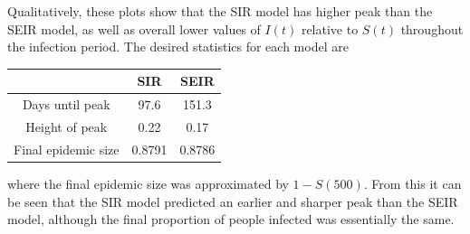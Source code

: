 \documentclass{article}
\begin{document}
\begin{figure}[H]
        \centering
\end{figure}
Qualitatively, these plots show that the SIR model has higher peak than the SEIR model, as well as overall lower values of $I(t)$ relative to $S(t)$ throughout the infection period. The desired statistics for each model are
\begin{center}
	\begin{tabular}{|c|c|c|}
		\hline
		& SIR & SEIR \\
		\hline
		Days until peak & 97.6 & 151.3 \\
		Height of peak & 0.22 & 0.17 \\
		Final epidemic size & 0.8791 & 0.8786 \\
		\hline
	\end{tabular}
\end{center}
where the final epidemic size was approximated by $1 - S(500)$. From this it can be seen that the SIR model predicted an earlier and sharper peak than the SEIR model, although the final proportion of people infected was essentially the same.
\end{document}
